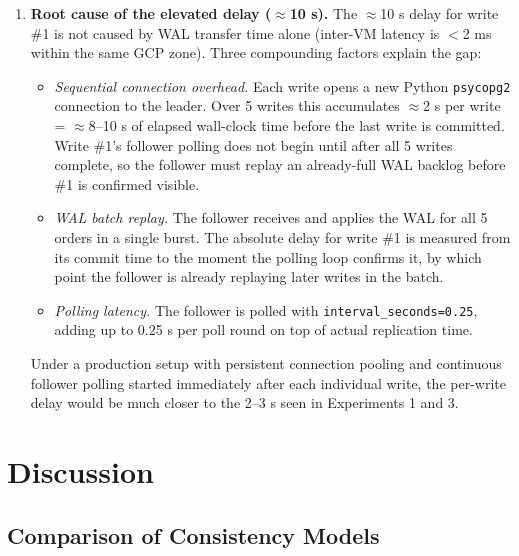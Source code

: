 \documentclass[12pt,a4paper]{article}
\begin{document}
\begin{enumerate}
    \item \textbf{Root cause of the elevated delay ($\approx$10 s).}
        The $\approx$10 s delay for write \#1 is not caused by WAL transfer time
        alone (inter-VM latency is $<$2 ms within the same GCP zone). Three
        compounding factors explain the gap:
        \begin{itemize}
            \item \textit{Sequential connection overhead.} Each write opens a new
                  Python \texttt{psycopg2} connection to the leader. Over 5
                  writes this accumulates $\approx$2 s per write = $\approx$8--10 s
                  of elapsed wall-clock time before the last write is committed.
                  Write \#1's follower polling does not begin until after all 5
                  writes complete, so the follower must replay an already-full WAL
                  backlog before \#1 is confirmed visible.
            \item \textit{WAL batch replay.} The follower receives and applies the
                  WAL for all 5 orders in a single burst. The absolute delay for
                  write \#1 is measured from its commit time to the moment the
                  polling loop confirms it, by which point the follower is already
                  replaying later writes in the batch.
            \item \textit{Polling latency.} The follower is polled with
                  \texttt{interval\_seconds=0.25}, adding up to 0.25 s per poll
                  round on top of actual replication time.
        \end{itemize}
        Under a production setup with persistent connection pooling and continuous
        follower polling started immediately after each individual write,
        the per-write delay would be much closer to the 2--3 s seen in Experiments
        1 and 3.
\end{enumerate}

\section{Discussion}

\subsection{Comparison of Consistency Models}
\end{document}
